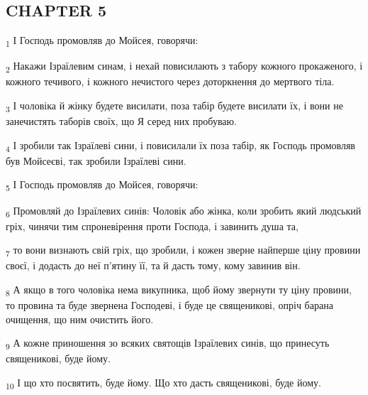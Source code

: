 \subsection{CHAPTER 5}
\begin{tcolorbox}
\textsubscript{1} І Господь промовляв до Мойсея, говорячи:
\end{tcolorbox}
\begin{tcolorbox}
\textsubscript{2} Накажи Ізраїлевим синам, і нехай повисилають з табору кожного прокаженого, і кожного течивого, і кожного нечистого через доторкнення до мертвого тіла.
\end{tcolorbox}
\begin{tcolorbox}
\textsubscript{3} І чоловіка й жінку будете висилати, поза табір будете висилати їх, і вони не занечистять таборів своїх, що Я серед них пробуваю.
\end{tcolorbox}
\begin{tcolorbox}
\textsubscript{4} І зробили так Ізраїлеві сини, і повисилали їх поза табір, як Господь промовляв був Мойсеєві, так зробили Ізраїлеві сини.
\end{tcolorbox}
\begin{tcolorbox}
\textsubscript{5} І Господь промовляв до Мойсея, говорячи:
\end{tcolorbox}
\begin{tcolorbox}
\textsubscript{6} Промовляй до Ізраїлевих синів: Чоловік або жінка, коли зробить який людський гріх, чинячи тим спроневірення проти Господа, і завинить душа та,
\end{tcolorbox}
\begin{tcolorbox}
\textsubscript{7} то вони визнають свій гріх, що зробили, і кожен зверне найперше ціну провини своєї, і додасть до неї п'ятину її, та й дасть тому, кому завинив він.
\end{tcolorbox}
\begin{tcolorbox}
\textsubscript{8} А якщо в того чоловіка нема викупника, щоб йому звернути ту ціну провини, то провина та буде звернена Господеві, і буде це священикові, опріч барана очищення, що ним очистить його.
\end{tcolorbox}
\begin{tcolorbox}
\textsubscript{9} А кожне приношення зо всяких святощів Ізраїлевих синів, що принесуть священикові, буде йому.
\end{tcolorbox}
\begin{tcolorbox}
\textsubscript{10} І що хто посвятить, буде йому. Що хто дасть священикові, буде йому.
\end{tcolorbox}
